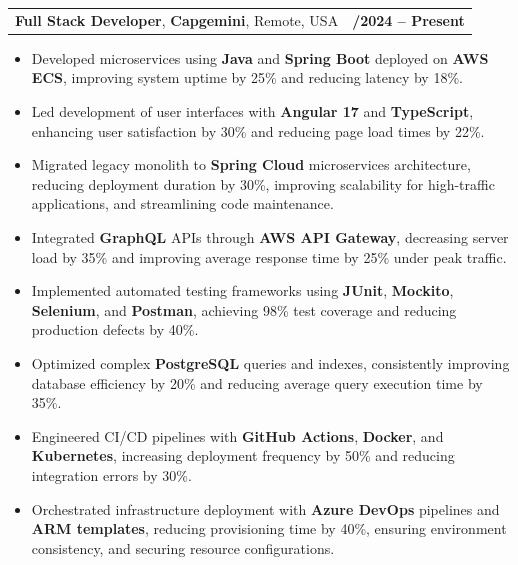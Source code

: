 \documentclass[letterpaper,11pt]{article}
\makeatletter
\newcommand{\resumeItem}[1]{
  \item\footnotesize{
    {#1 \vspace{-2pt}}
  }
}
\newcommand{\resumeSubheading}[4]{
  \vspace{-2pt}\item
    \begin{tabular*}{1.0\textwidth}[t]{l@{\extracolsep{\fill}}r}
      \textbf{\fontsize{10pt}{14pt}\selectfont #3}, \textbf{\fontsize{10pt}{14pt}\selectfont #1}, \fontsize{10pt}{14pt}\selectfont #4 & \textbf{\fontsize{10pt}{14pt}\selectfont #2} \\
    \end{tabular*}\vspace{-7pt}
}
\newcommand{\resumeItemListStart}{\begin{itemize}[leftmargin=*]}
\newcommand{\resumeItemListEnd}{\end{itemize}\vspace{-5pt}}
\makeatother
\begin{document}
    \resumeSubheading
        {Capgemini}{01/2024 -- Present}
        {Full Stack Developer}{Remote, USA}
      \resumeItemListStart
        \resumeItem{Developed microservices using \textbf{Java} and \textbf{Spring Boot} deployed on \textbf{AWS ECS}, improving system uptime by 25\% and reducing latency by 18\%.}
        \resumeItem{Led development of user interfaces with \textbf{Angular 17} and \textbf{TypeScript}, enhancing user satisfaction by 30\% and reducing page load times by 22\%.}
        \resumeItem{Migrated legacy monolith to \textbf{Spring Cloud} microservices architecture, reducing deployment duration by 30\%, improving scalability for high-traffic applications, and streamlining code maintenance.}
        \resumeItem{Integrated \textbf{GraphQL} APIs through \textbf{AWS API Gateway}, decreasing server load by 35\% and improving average response time by 25\% under peak traffic.}
        \resumeItem{Implemented automated testing frameworks using \textbf{JUnit}, \textbf{Mockito}, \textbf{Selenium}, and \textbf{Postman}, achieving 98\% test coverage and reducing production defects by 40\%.}
        \resumeItem{Optimized complex \textbf{PostgreSQL} queries and indexes, consistently improving database efficiency by 20\% and reducing average query execution time by 35\%.}
        \resumeItem{Engineered CI/CD pipelines with \textbf{GitHub Actions}, \textbf{Docker}, and \textbf{Kubernetes}, increasing deployment frequency by 50\% and reducing integration errors by 30\%.}
        \resumeItem{Orchestrated infrastructure deployment with \textbf{Azure DevOps} pipelines and \textbf{ARM templates}, reducing provisioning time by 40\%, ensuring environment consistency, and securing resource configurations.}
      \resumeItemListEnd
\end{document}
